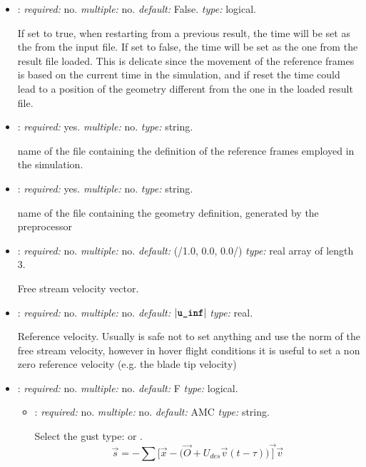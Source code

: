 \begin{itemize}
\item {}: \textit{required:} no. \textit{multiple:} no. \textit{default:} False. \textit{type:} logical.

If set to true, when restarting from a previous result, the time will be set as the  from the input file. If set to false, the time will be set as the one from the result file loaded. This is delicate since the movement of the reference frames is based on the current time in the simulation, and if reset the time could lead to a position of the geometry different from the one in the loaded result file.


\item {}: \textit{required:} yes. \textit{multiple:} no. \textit{type:} string.

name of the file containing the definition of the reference frames employed in the simulation.


\item {}: \textit{required:} yes. \textit{multiple:} no. \textit{type:} string.

name of the file containing the geometry definition, generated by the preprocessor


\item {}: \textit{required:} no. \textit{multiple:} no. \textit{default:} (/1.0, 0.0, 0.0/) \textit{type:} real array of length 3.

Free stream velocity vector.

\item {}: \textit{required:} no. \textit{multiple:} no. \textit{default:} $|\text{\textbf{\texttt{u\_inf}}}|$ \textit{type:} real.

Reference velocity. Usually is safe not to set anything and use the norm of the free stream velocity, however in hover flight conditions it is useful to set a non zero reference velocity (e.g. the blade tip velocity)


\item {}: \textit{required:} no. \textit{multiple:} no. \textit{default:} F \textit{type:} logical.

\begin{itemize}
    
    \item {}: \textit{required:} no. \textit{multiple:} no. \textit{default:} AMC \textit{type:} string.
    
    Select the gust type:  or .
    \begin{equation}
        \vec{s} = -\sum \big[\vec{x} - \big(\vec{O} + U_{des}\vec{v}(t-\tau)\big)\vec]\vec{v}
    \end{equation}
        

\end{itemize}
\end{itemize}
